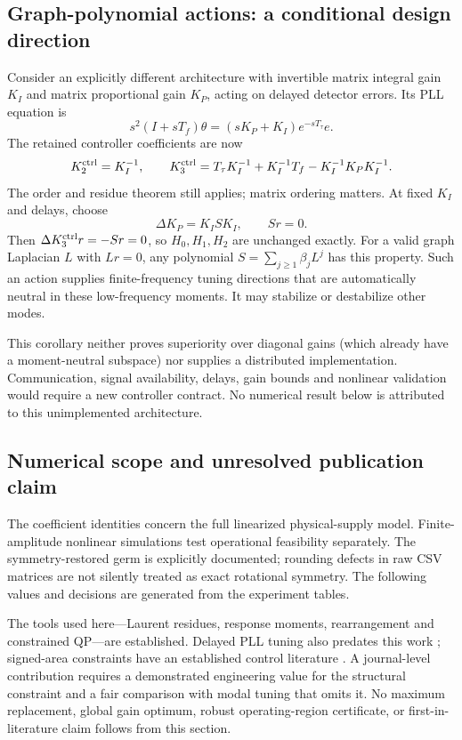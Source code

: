 \subsection{Graph-polynomial actions: a conditional design direction}
Consider an explicitly different architecture with invertible matrix integral
gain $K_I$ and matrix proportional gain $K_P$, acting on delayed detector
errors. Its PLL equation is
\[
 s^2(I+sT_f)\theta=(sK_P+K_I)e^{-sT_\tau}e.
\]
The retained controller coefficients are now
\[
 K_2^{\rm ctrl}=K_I^{-1},\qquad
 K_3^{\rm ctrl}=T_\tau K_I^{-1}+K_I^{-1}T_f
                         -K_I^{-1}K_PK_I^{-1}.
\]
The order and residue theorem still applies; matrix ordering matters.
At fixed $K_I$ and delays, choose
\begin{equation}
 \Delta K_P=K_I S K_I,\qquad Sr=0.
 \label{eq:graphneutral}
\end{equation}
Then $\Delta K_3^{\rm ctrl}r=-Sr=0$, so $H_0,H_1,H_2$ are unchanged exactly.
For a valid graph Laplacian $L$ with $Lr=0$, any polynomial
$S=\sum_{j\ge1}\beta_jL^j$ has this property. Such an action supplies
finite-frequency tuning directions that are automatically neutral in these
low-frequency moments. It may stabilize or destabilize other modes.

This corollary neither proves superiority over diagonal gains (which already
have a moment-neutral subspace) nor supplies a distributed implementation.
Communication, signal availability, delays, gain bounds and nonlinear
validation would require a new controller contract. No numerical result below
is attributed to this unimplemented architecture.

\subsection{Numerical scope and unresolved publication claim}
The coefficient identities concern the full linearized physical-supply model.
Finite-amplitude nonlinear simulations test operational feasibility separately.
The symmetry-restored germ is explicitly documented; rounding defects in raw
CSV matrices are not silently treated as exact rotational symmetry. The
following values and decisions are generated from the experiment tables.

The tools used here---Laurent residues, response moments, rearrangement and
constrained QP---are established. Delayed PLL tuning also predates this work
\cite{wilson}; signed-area constraints have an established control literature
\cite{aalipourmoments}. A journal-level contribution requires a demonstrated
engineering value for the structural constraint and a fair comparison with
modal tuning that omits it. No maximum replacement, global gain optimum,
robust operating-region certificate, or first-in-literature claim follows
from this section.

